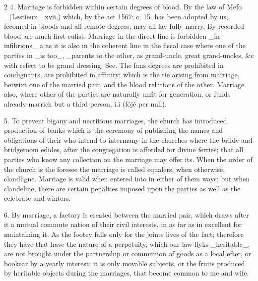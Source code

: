\documentclass[10pt]{article}
\begin{document}
\begin{multicols}{2}\raggedcolumns
4. Marriage is forbidden within certain degrees of blood. By the law of Mefo \_(Lestieux\_ xvii,) which, by the act 1567; c. 15. has been adopted by us, fecomed in bloods and all remote degrees, may all lay fully marry. By recorded blood are much first cufist. Marriage in the direct line is forbidden \_in infibrions\_ a as it is also in the coherent line in the fiscal case where one of the parties in \_is too\_, \_parents to the other, as grand-uncle, great grand-uncles, \&c with refect to be grand dressing. See. The fans degrees are prohibited in condignants, are prohibited in affinity; which is the tie arising from marriage, betwixt one of the married pair, and the blood relations of the other. Marriage also, where other of the parties are naturally unfit for generation, or funds already marrich but a third person, i.i (fójé per null).

5. To prevent bigany and nectitious marriages, the church has introduced production of banks which is the ceremony of publishing the names and obligations of their who intend to intermany in the churches where the brilde and bridgeroom edides, after the congregation is afforded for divine ferries; that all parties who know any collection on the marriage may offer its. When the order of the church is the foresee the marriage is called equalers, when otherwise, clandligne. Marriage is valid when entered into in either of them ways; but when clandeline, there are certain penalties imposed upon the parties as well as the celebrate and winters.

6. By marriage, a factory is created between the married pair, which draws after it a mutual commute nation of their civil interests, in as far as in excellent for maintaining it. As the footey falls only for the joints lives of the fact; therefore they have that have the nature of a perpetuity, which our law flyks \_heritable\_, are not brought under the partnership or communion of goods as a local efter, or bookear by a yearly interest: it is only movable subjects, or the fruits produced by heritable objects during the marriages, that become common to me and wife.


\end{multicols}
\end{document}
